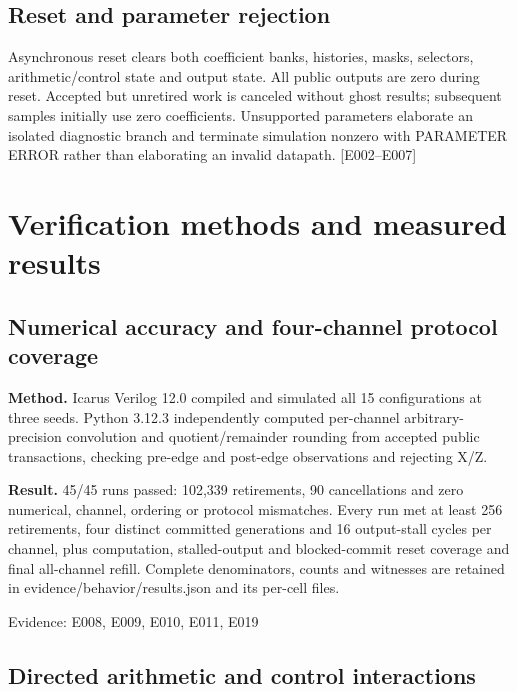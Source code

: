 \documentclass[11pt,a4paper]{article}
\begin{document}
\subsection{Reset and parameter rejection}

Asynchronous reset clears both coefficient banks,\allowbreak{} histories,\allowbreak{} masks,\allowbreak{} selectors,\allowbreak{} arithmetic/\allowbreak{}control state and output state. All public outputs are zero during reset. Accepted but unretired work is canceled without ghost results; subsequent samples initially use zero coefficients. Unsupported parameters elaborate an isolated diagnostic branch and terminate simulation nonzero with PARAMETER ERROR rather than elaborating an invalid datapath. [\allowbreak{}E002–E007]\allowbreak{}

\section{Verification methods and measured results}

\subsection{Numerical accuracy and four-channel protocol coverage}

\textbf{Method.} Icarus Verilog 12.0 compiled and simulated all 15 configurations at three seeds. Python 3.12.3 independently computed per-channel arbitrary-precision convolution and quotient/\allowbreak{}remainder rounding from accepted public transactions,\allowbreak{} checking pre-edge and post-edge observations and rejecting X/\allowbreak{}Z.

\textbf{Result.} 45/\allowbreak{}45 runs passed: 102,\allowbreak{}339 retirements,\allowbreak{} 90 cancellations and zero numerical,\allowbreak{} channel,\allowbreak{} ordering or protocol mismatches. Every run met at least 256 retirements,\allowbreak{} four distinct committed generations and 16 output-stall cycles per channel,\allowbreak{} plus computation,\allowbreak{} stalled-output and blocked-commit reset coverage and final all-channel refill. Complete denominators,\allowbreak{} counts and witnesses are retained in evidence/\allowbreak{}behavior/\allowbreak{}results.json and its per-cell files.

{\small Evidence: E008,\allowbreak{} E009,\allowbreak{} E010,\allowbreak{} E011,\allowbreak{} E019}

\subsection{Directed arithmetic and control interactions}
\end{document}
